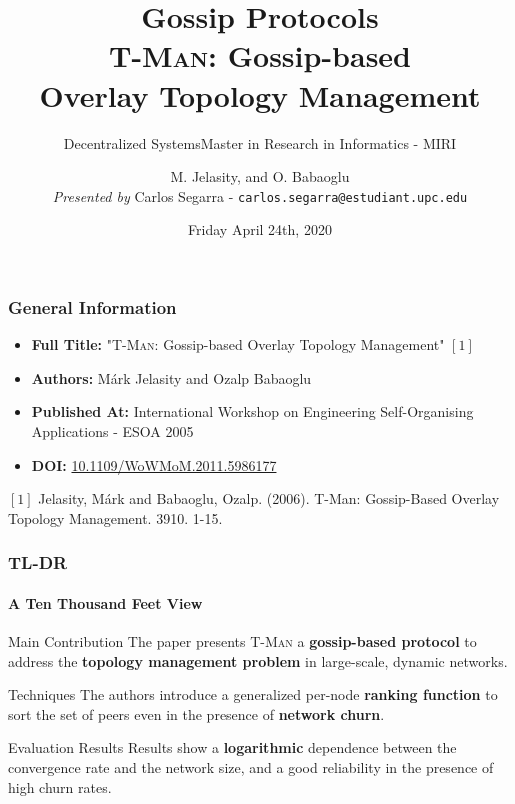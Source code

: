 \documentclass[10pt,    %
    english,            %
    xcolor=table,       %
    envcountsect,        %
    aspectratio=169     %
]{beamer}
\subtitle{Decentralized Systems} %
\title[Decentralized Systems] %
    {\normalsize Gossip Protocols \\ \Large \textsc{T-Man:} Gossip-based \\ \Large Overlay Topology Management}
\subtitle{Master in Research in Informatics - MIRI}
\date[April 24th, 2020] %
    {Friday April 24th, 2020}
\author[] %
{M. Jelasity, and O. Babaoglu \\\small \textit{Presented by} Carlos Segarra - \texttt{carlos.segarra@estudiant.upc.edu}}
\begin{document}
\begin{frame}
  \titlepage
\end{frame}

\begin{frame}
    \frametitle{General Information}

    \begin{itemize}
        \item \textbf{Full Title:} "\textsc{T-Man:} Gossip-based Overlay Topology Management" $[1]$
        \item \textbf{Authors:} M\'ark Jelasity and Ozalp Babaoglu
        \item \textbf{Published At:} International Workshop on Engineering Self-Organising Applications
 - ESOA 2005
        \item \textbf{DOI:} \href{https://doi.org/10.1109/WoWMoM.2011.5986177}{10.1109/WoWMoM.2011.5986177}
    \end{itemize}


    \small
    \begin{description}
        \item $[1]$ Jelasity, Márk and Babaoglu, Ozalp. (2006). T-Man: Gossip-Based Overlay Topology Management. 3910. 1-15. 
    \end{description}
 

\end{frame}

\begin{frame}
    \frametitle{TL-DR}
    \framesubtitle{A Ten Thousand Feet View}

    \vspace{-25pt}

    \begin{alertblock}{Main Contribution}
        The paper presents \textsc{T-Man} a \textbf{gossip-based protocol} to address the \textbf{topology management problem} in large-scale, dynamic networks.
    \end{alertblock}

    \begin{block}{Techniques}
        The authors introduce a generalized per-node \textbf{ranking function} to sort the set of peers even in the presence of \textbf{network churn}.
    \end{block}

    \begin{alertblock}{Evaluation Results}
        Results show a \textbf{logarithmic} dependence between the convergence rate and the network size, and a good reliability in the presence of high churn rates.
    \end{alertblock}

\end{frame}
\end{document}
